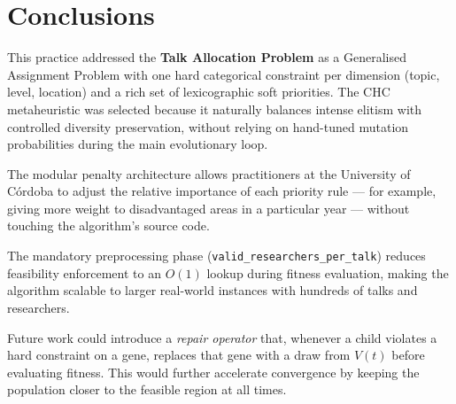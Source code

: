 \documentclass[12pt, a4paper]{article}
\begin{document}
\section{Conclusions}

This practice addressed the \textbf{Talk Allocation Problem} as a Generalised
Assignment Problem with one hard categorical constraint per dimension (topic,
level, location) and a rich set of lexicographic soft priorities. The CHC
metaheuristic was selected because it naturally balances intense elitism with
controlled diversity preservation, without relying on hand-tuned mutation
probabilities during the main evolutionary loop.

The modular penalty architecture allows practitioners at the University of Córdoba
to adjust the relative importance of each priority rule — for example, giving more
weight to disadvantaged areas in a particular year — without touching the algorithm's
source code.

The mandatory preprocessing phase (\texttt{valid\_researchers\_per\_talk}) reduces
feasibility enforcement to an $O(1)$ lookup during fitness evaluation, making the
algorithm scalable to larger real-world instances with hundreds of talks and researchers.

Future work could introduce a \emph{repair operator} that, whenever a child violates a
hard constraint on a gene, replaces that gene with a draw from $V(t)$ before
evaluating fitness. This would further accelerate convergence by keeping the
population closer to the feasible region at all times.
\end{document}
